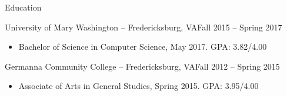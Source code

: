 \documentclass[]{mcdowellcv}
\begin{document}
	\begin{cvsection}{Education}
		\begin{cvsubsection}{University of Mary Washington -- Fredericksburg, VA}{Fall 2015 -- Spring 2017}
			\begin{itemize}
				\item Bachelor of Science in Computer Science, May 2017. GPA: 3.82/4.00
			\end{itemize}
		\end{cvsubsection}
		\begin{cvsubsection}{Germanna Community College -- Fredericksburg, VA}{Fall 2012 -- Spring 2015}
			\begin{itemize}
				\item Associate of Arts in General Studies, Spring 2015. GPA: 3.95/4.00
			\end{itemize}
		\end{cvsubsection}
	\end{cvsection}
	
\end{document}
